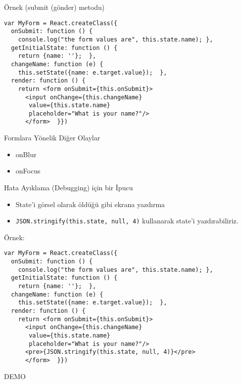 \documentclass[presentation]{beamer}
\begin{document}
\begin{frame}[fragile,label=sec-11]{Örnek (submit (gönder) metodu)}
 \begin{verbatim}
var MyForm = React.createClass({
  onSubmit: function () {
    console.log("the form values are", this.state.name); },
  getInitialState: function () {
    return {name: ''};  },
  changeName: function (e) {
    this.setState({name: e.target.value});  },
  render: function () {
    return <form onSubmit={this.onSubmit}>
      <input onChange={this.changeName}
       value={this.state.name}
       placeholder="What is your name?"/>
      </form>  }})
\end{verbatim}
\end{frame}


\begin{frame}[label=sec-12]{Formlara Yönelik Diğer Olaylar}
\begin{itemize}
\item onBlur
\item onFocus
\end{itemize}
\end{frame}

\begin{frame}[fragile,label=sec-13]{Hata Ayıklama (Debugging) için bir İpucu}
 \begin{itemize}
\item State'i görsel olarak öldüğü gibi ekrana yazdırma
\item \texttt{JSON.stringify(this.state, null, 4)} kullanarak state'i yazdırabiliriz.
\end{itemize}
\end{frame}

\begin{frame}[fragile,label=sec-14]{Örnek:}
 \begin{verbatim}
var MyForm = React.createClass({
  onSubmit: function () {
    console.log("the form values are", this.state.name); },
  getInitialState: function () {
    return {name: ''};  },
  changeName: function (e) {
    this.setState({name: e.target.value});  },
  render: function () {
    return <form onSubmit={this.onSubmit}>
      <input onChange={this.changeName}
       value={this.state.name}
       placeholder="What is your name?"/>
      <pre>{JSON.stringify(this.state, null, 4)}</pre>
      </form>  }})
\end{verbatim}


DEMO
\end{frame}
\end{document}
